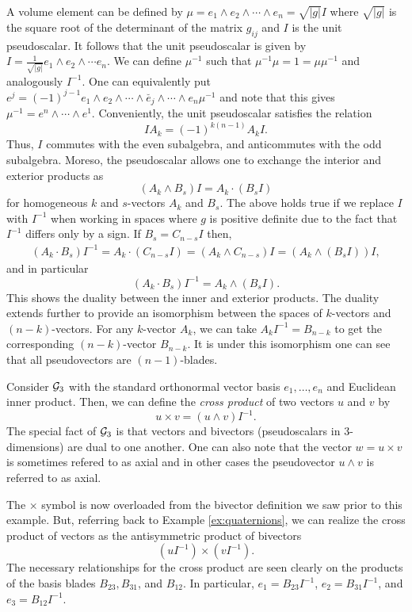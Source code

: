 A volume element can be defined by $\mu=e_1 \wedge e_2 \wedge \cdots \wedge e_n = \sqrt{|g|} I$ where $\sqrt{|g|}$ is the square root of the determinant of the matrix $g_{ij}$ and $I$ is the unit pseudoscalar. It follows that the unit pseudoscalar is given by $I=\frac{1}{\sqrt{|g|}} e_1 \wedge e_2 \wedge \cdots e_n$. We can define $\mu^{-1}$ such that $\mu^{-1}\mu = 1 = \mu \mu^{-1}$ and analogously $I^{-1}$.  One can equivalently put $e^j = (-1)^{j-1} e_1 \wedge e_2 \wedge \cdots \wedge \breve{e_j} \wedge \cdots \wedge e_n \mu^{-1}$ and note that this gives $\mu^{-1} = e^n \wedge \cdots \wedge e^1$.  Conveniently, the unit pseudoscalar satisfies the relation
\[
IA_k = (-1)^{k(n-1)} A_k I.
\]
Thus, $I$ commutes with the even subalgebra, and anticommutes with the odd subalgebra.  Moreso, the pseudoscalar allows one to exchange the interior and exterior products as
\begin{equation}
\label{eq:wedge_to_dot}
 (A_k \wedge B_s) I = A_k \cdot (B_s I)
\end{equation}
for homogeneous $k$ and $s$-vectors $A_k$ and $B_s$. The above holds true if we replace $I$ with $I^{-1}$ when working in spaces where $g$ is positive definite due to the fact that $I^{-1}$ differs only by a sign. If $B_s = C_{n-s}I$ then,
\begin{align*}
 (A_k \cdot B_s)I^{-1} = A_k \cdot (C_{n-s}I) = (A_k \wedge C_{n-s})I = (A_k \wedge (B_sI))I,
\end{align*}
and in particular
\begin{equation}
\label{eq:dot_to_wedge}
    (A_k \cdot B_s)I^{-1} = A_k \wedge (B_s I).
\end{equation}
This shows the duality between the inner and exterior products. The duality extends further to provide an isomorphism between the spaces of $k$-vectors and $(n-k)$-vectors. For any $k$-vector $A_k$, we can take $A_k I^{-1}=B_{n-k}$ to get the corresponding $(n-k)$-vector $B_{n-k}$. It is under this isomorphism one can see that all pseudovectors are $(n-1)$-blades. 

\begin{example}
\label{ex:cross_product}
Consider $\mathcal{G}_3$ with the standard orthonormal vector basis $e_1,\dots,e_n$ and Euclidean inner product.  Then, we can define the \emph{cross product} of two vectors $u$ and $v$ by
\[
u \times v = (u\wedge v)I^{-1}.
\]
The special fact of $\mathcal{G}_3$ is that vectors and bivectors (pseudoscalars in 3-dimensions) are dual to one another. One can also note that the vector $w=u\times v$ is sometimes refered to as axial and in other cases the pseudovector $u\wedge v$ is referred to as axial. 

The $\times$ symbol is now overloaded from the bivector definition we saw prior to this example.  But, referring back to Example \ref{ex:quaternions}, we can realize the cross product of vectors as the antisymmetric product of bivectors
\[
(uI^{-1})\times (vI^{-1}). 
\]
The necessary relationships for the cross product are seen clearly on the products of the basis blades $B_{23}, B_{31}$, and $B_{12}$. In particular, $e_1 = B_{23}I^{-1}$, $e_2 = B_{31} I^{-1}$, and $e_3 = B_{12} I^{-1}$.
\end{example}

